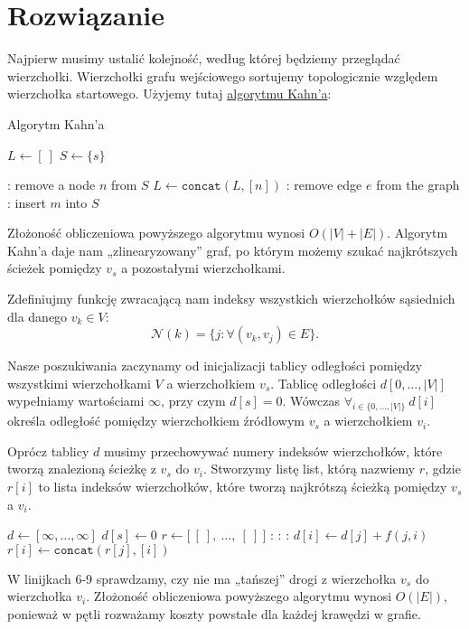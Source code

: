 \documentclass[14pt]{article}
\begin{document}
\section{Rozwiązanie}

Najpierw musimy ustalić kolejność, według której będziemy przeglądać wierzchołki. Wierzchołki grafu wejściowego sortujemy topologicznie względem wierzchołka startowego. Użyjemy tutaj \href{https://en.wikipedia.org/wiki/Topological_sorting#Kahn's_algorithm}{algorytmu Kahn'a}:

\begin{algorithm}
  \caption{Algorytm Kahn'a}
  \label{kahn}
  \begin{algorithmic}[1]
    \State $L \gets [~]$
    \State $S \gets \{s\}$

    :
      \State remove a node $n$ from $S$
      \State $L \gets \texttt{concat}(L, [n])$
      :
        \State remove edge $e$ from the graph
        :
          \State insert $m$ into $S$
        \EndIf
      \EndFor
    \EndWhile
  \end{algorithmic}
\end{algorithm}
Złożoność obliczeniowa powyższego algorytmu wynosi $O(|V| + |E|)$. Algorytm Kahn'a daje nam „zlinearyzowany” graf, po którym możemy szukać najkrótszych ścieżek pomiędzy $v_s$ a pozostałymi wierzchołkami.

Zdefiniujmy funkcję zwracającą nam indeksy wszystkich wierzchołków sąsiednich dla danego $v_k \in V$:
$$
\mathcal{N}(k) = \{j: \forall(v_k,v_j) \in E\}.
$$

Nasze poszukiwania zaczynamy od inicjalizacji tablicy odległości pomiędzy wszystkimi wierzchołkami $V$ a wierzchołkiem $v_s$.
Tablicę odległości $d[0,\dots,|V|]$ wypełniamy wartościami $\infty$, przy czym $d[s] = 0$. Wówczas $\forall_{i\in\{0,\dots,|V|\}}~ d[i]$ określa odległość pomiędzy wierzchołkiem źródłowym $v_s$ a wierzchołkiem $v_i$.

Oprócz tablicy $d$ musimy przechowywać numery indeksów wierzchołków, które tworzą znalezioną ścieżkę z $v_s$ do $v_i$. Stworzymy listę list, którą nazwiemy $r$, gdzie $r[i]$ to lista indeksów wierzchołków, które tworzą najkrótszą ścieżką pomiędzy $v_s$ a $v_i$.

\begin{algorithm}[H]
  \begin{algorithmic}[1]
    \State $d \gets [\infty,\dots,\infty]$
    \State $d[s] \gets 0$
    \State $r \gets \big[~[~],~\dots,~[~]~\big]$
    :
      :
        :
          \State $d[i] \gets d[j] + f(j,i)$
          \State $r[i] \gets \texttt{concat}(r[j], [i])$
        \EndIf
      \EndFor
    \EndFor
  \end{algorithmic}
\end{algorithm}

W linijkach 6-9 sprawdzamy, czy nie ma „tańszej” drogi z wierzchołka $v_s$ do wierzchołka $v_i$. Złożoność obliczeniowa powyższego algorytmu wynosi $O(|E|)$, ponieważ w pętli rozważamy koszty powstałe dla każdej krawędzi w grafie.
\end{document}
